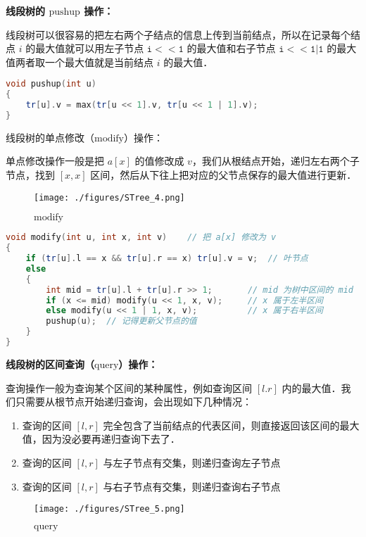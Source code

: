 \textbf{线段树的 $\text{pushup}$ 操作：}

线段树可以很容易的把左右两个子结点的信息上传到当前结点，所以在记录每个结点 $i$ 的最大值就可以用左子节点 $\mathtt{i<<1}$ 的最大值和右子节点 $\mathtt{i<<1|1}$ 的最大值两者取一个最大值就是当前结点 $i$ 的最大值．

\begin{lstlisting}[language=cpp]
void pushup(int u)
{
    tr[u].v = max(tr[u << 1].v, tr[u << 1 | 1].v);
}
\end{lstlisting}

线段树的单点修改（$\text{modify}$）操作：

单点修改操作一般是把 $a[x]$ 的值修改成 $v$，我们从根结点开始，递归左右两个子节点，找到 $[x, x]$ 区间，然后从下往上把对应的父节点保存的最大值进行更新．

\begin{figure}[ht]
\centering
\texttt{[image: ./figures/STree\_4.png]}
\caption{$\text{modify}$} \label{STree_fig4}
\end{figure}


\begin{lstlisting}[language=cpp]
void modify(int u, int x, int v)    // 把 a[x] 修改为 v
{
    if (tr[u].l == x && tr[u].r == x) tr[u].v = v;  // 叶节点
    else
    {
        int mid = tr[u].l + tr[u].r >> 1;       // mid 为树中区间的 mid
        if (x <= mid) modify(u << 1, x, v);     // x 属于左半区间
        else modify(u << 1 | 1, x, v);          // x 属于右半区间
        pushup(u);  // 记得更新父节点的值
    }
}
\end{lstlisting}

\textbf{线段树的区间查询（$\text{query}$）操作：}

查询操作一般为查询某个区间的某种属性，例如查询区间 $[l. r]$ 内的最大值．我们只需要从根节点开始递归查询，会出现如下几种情况：

\begin{enumerate}
\item 查询的区间 $[l, r]$ 完全包含了当前结点的代表区间，则直接返回该区间的最大值，因为没必要再递归查询下去了．
\item 查询的区间 $[l, r]$ 与左子节点有交集，则递归查询左子节点
\item 查询的区间 $[l, r]$ 与右子节点有交集，则递归查询右子节点
\end{enumerate}

\begin{figure}[ht]
\centering
\texttt{[image: ./figures/STree\_5.png]}
\caption{$\text{query}$} \label{STree_fig5}
\end{figure}

